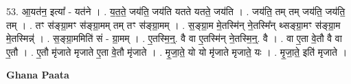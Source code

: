\documentclass[17pt]{extarticle}
\begin{document}
53. आ॒यत॑न॒ इत्या᳚ - यत॑ने । . य॒त॒ते॒ जय॑ति॒ जय॑ति यतते यतते॒ जय॑ति । . जय॑ति॒ तम् तम् जय॑ति॒ जय॑ति॒ तम् । . तꣳ स॑ङ्ग्रा॒मꣳ स॑ङ्ग्रा॒मम् तम् तꣳ स॑ङ्ग्रा॒मम् । . स॒ङ्ग्रा॒म मे॒तस्मि॑न् ने॒तस्मि᳚न् थ्सङ्ग्रा॒मꣳ स॑ङ्ग्रा॒म मे॒तस्मिन्न्॑ । . स॒ङ्ग्रा॒ममिति॑ सं - ग्रा॒मम् । . ए॒तस्मि॒न्॒. वै वा ए॒तस्मि॑न् ने॒तस्मि॒न्॒. वै । . वा ए॒ता वे॒तौ वै वा ए॒तौ । . ए॒तौ मृ॑जाते मृजाते ए॒ता वे॒तौ मृ॑जाते । . मृ॒जा॒ते॒ यो यो मृ॑जाते मृजाते॒ यः । . मृ॒जा॒ते॒ इति॑ मृजाते । \newline

\textbf{Ghana Paata } \newline
\end{document}
